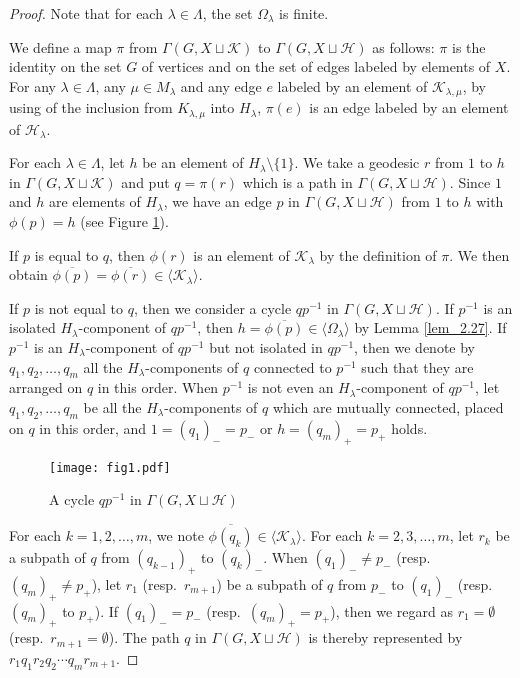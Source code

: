 \documentclass{amsart}
\theoremstyle{definition}
\begin{document}
\begin{proof}
Note that for each $\lambda\in\Lambda$, the set $\Omega_\lambda$ is finite. 

We define a map $\pi$ from $\Gamma(G, X\sqcup{\mathcal K})$ to $\Gamma(G,X\sqcup{\mathcal H})$ as follows:
$\pi$ is the identity on the set $G$ of vertices and on the set of edges labeled by elements of $X$. 
For any $\lambda\in \Lambda$, any $\mu \in M_\lambda$ and any edge $e$ labeled by an element of ${\mathcal K}_{\lambda,\mu}$, by using of the inclusion from $K_{\lambda,\mu}$ into $H_\lambda$, $\pi(e)$ is an edge labeled by an element of ${\mathcal H}_\lambda$. 

For each $\lambda\in\Lambda$, let  $h$ be an element of $H_\lambda\setminus \{1\}$.
We take a geodesic $r$ from $1$ to $h$ in $\Gamma(G, X\sqcup{\mathcal K})$ and put $q=\pi(r)$ which is a path in $\Gamma(G, X\sqcup{\mathcal H})$. 
Since $1$ and $h$ are elements of $H_\lambda$, we have an edge $p$ in $\Gamma(G,X\sqcup{\mathcal H})$ from $1$ to $h$ with $\phi(p)=h$ (see Figure \ref{fig1}). 

If $p$ is equal to $q$, then $\phi(r)$ is an element of ${\mathcal K}_\lambda$ by the definition of $\pi$.
We then obtain $\overline{\phi(p)}=\overline{\phi(r)}\in \langle{\mathcal K}_\lambda\rangle$. 

If $p$ is not equal to $q$, then we consider a cycle $qp^{-1}$ in $\Gamma(G, X\sqcup{\mathcal H})$. 
If $p^{-1}$ is an isolated $H_\lambda$-component of $qp^{-1}$, then $h=\overline{\phi(p)}\in \langle \Omega_\lambda \rangle$ by Lemma \ref{lem_2.27}. 
If $p^{-1}$ is an $H_\lambda$-component of $qp^{-1}$ but not isolated in $qp^{-1}$, then we denote by $q_1, q_2, \ldots, q_m$ all the $H_\lambda$-components of $q$ connected to $p^{-1}$ such that they are arranged on $q$ in this order. 
When $p^{-1}$ is not even an $H_\lambda$-component of $qp^{-1}$, let $q_1,q_2,\ldots ,q_m$ be all the $H_\lambda$-components of $q$ which are mutually connected, placed on $q$ in this order, and $1=(q_1)_-=p_-$ or $h=(q_m)_+=p_+$ holds. 

\begin{figure}[top]
\begin{center}
\texttt{[image: fig1.pdf]}
\end{center}
\caption{A cycle $qp^{-1}$ in $\Gamma(G,X\sqcup {\mathcal H})$}
\label{fig1}
\end{figure}

For each $k=1,2,\ldots,m$, we note $\overline{\phi(q_k)}\in\langle {\mathcal K}_\lambda\rangle$. 
For each $k=2,3,\ldots,m$, let $r_k$ be a subpath of $q$ from $(q_{k-1})_+$ to $(q_k)_-$. 
When $(q_1)_-\ne p_-$ (resp.\ $(q_m)_+\ne p_+$), let $r_1$ (resp.\ $r_{m+1}$) be a subpath of $q$ from $p_-$ to $(q_1)_-$ (resp.\ $(q_m)_+$ to $p_+$). 
If $(q_1)_-=p_-$ (resp.\ $(q_m)_+=p_+$), then we regard as $r_1=\emptyset$ (resp.\ $r_{m+1}=\emptyset$). 
The path $q$ in $\Gamma(G,X\sqcup {\mathcal H})$ is thereby represented by $r_1q_1r_2q_2\cdots q_mr_{m+1}$. 


\end{proof}
\end{document}
